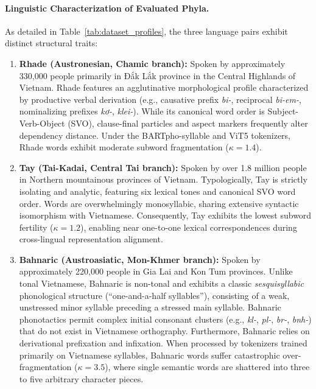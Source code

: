 \documentclass[11pt]{article}
\begin{document}
\paragraph{Linguistic Characterization of Evaluated Phyla.}
As detailed in Table~\ref{tab:dataset_profiles}, the three language pairs exhibit distinct structural traits:
\begin{enumerate}[leftmargin=*]
    \item \textbf{Rhade (Austronesian, Chamic branch):} Spoken by approximately 330,000 people primarily in Đắk Lắk province in the Central Highlands of Vietnam. Rhade features an agglutinative morphological profile characterized by productive verbal derivation (e.g., causative prefix \textit{bi-}, reciprocal \textit{bi-em-}, nominalizing prefixes \textit{kơ-}, \textit{klei-}). While its canonical word order is Subject-Verb-Object (SVO), clause-final particles and aspect markers frequently alter dependency distance. Under the BARTpho-syllable and ViT5 tokenizers, Rhade words exhibit moderate subword fragmentation ($\kappa = 1.4$).
    \item \textbf{Tay (Tai-Kadai, Central Tai branch):} Spoken by over 1.8 million people in Northern mountainous provinces of Vietnam. Typologically, Tay is strictly isolating and analytic, featuring six lexical tones and canonical SVO word order. Words are overwhelmingly monosyllabic, sharing extensive syntactic isomorphism with Vietnamese. Consequently, Tay exhibits the lowest subword fertility ($\kappa = 1.2$), enabling near one-to-one lexical correspondences during cross-lingual representation alignment.
    \item \textbf{Bahnaric (Austroasiatic, Mon-Khmer branch):} Spoken by approximately 220,000 people in Gia Lai and Kon Tum provinces. Unlike tonal Vietnamese, Bahnaric is non-tonal and exhibits a classic \textit{sesquisyllabic} phonological structure (``one-and-a-half syllables''), consisting of a weak, unstressed minor syllable preceding a stressed main syllable. Bahnaric phonotactics permit complex initial consonant clusters (e.g., \textit{kl-}, \textit{pl-}, \textit{br-}, \textit{bnh-}) that do not exist in Vietnamese orthography. Furthermore, Bahnaric relies on derivational prefixation and infixation. When processed by tokenizers trained primarily on Vietnamese syllables, Bahnaric words suffer catastrophic over-fragmentation ($\kappa = 3.5$), where single semantic words are shattered into three to five arbitrary character pieces.
\end{enumerate}
\end{document}
